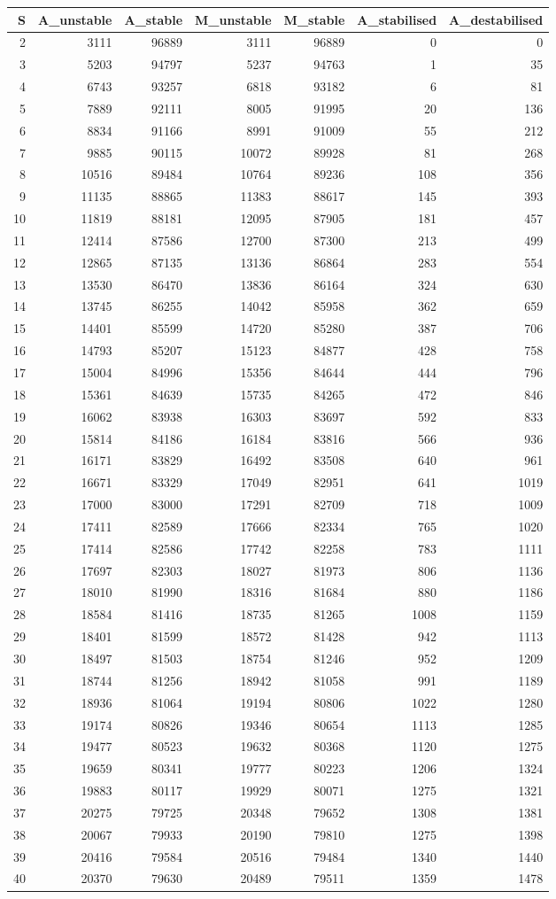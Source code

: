 \documentclass[]{article}
\begin{document}
\begin{longtable}[]{@{}rrrrrrr@{}}
\toprule
S & A\_unstable & A\_stable & M\_unstable & M\_stable & A\_stabilised &
A\_destabilised\tabularnewline
\midrule
\endhead
2 & 3111 & 96889 & 3111 & 96889 & 0 & 0\tabularnewline
3 & 5203 & 94797 & 5237 & 94763 & 1 & 35\tabularnewline
4 & 6743 & 93257 & 6818 & 93182 & 6 & 81\tabularnewline
5 & 7889 & 92111 & 8005 & 91995 & 20 & 136\tabularnewline
6 & 8834 & 91166 & 8991 & 91009 & 55 & 212\tabularnewline
7 & 9885 & 90115 & 10072 & 89928 & 81 & 268\tabularnewline
8 & 10516 & 89484 & 10764 & 89236 & 108 & 356\tabularnewline
9 & 11135 & 88865 & 11383 & 88617 & 145 & 393\tabularnewline
10 & 11819 & 88181 & 12095 & 87905 & 181 & 457\tabularnewline
11 & 12414 & 87586 & 12700 & 87300 & 213 & 499\tabularnewline
12 & 12865 & 87135 & 13136 & 86864 & 283 & 554\tabularnewline
13 & 13530 & 86470 & 13836 & 86164 & 324 & 630\tabularnewline
14 & 13745 & 86255 & 14042 & 85958 & 362 & 659\tabularnewline
15 & 14401 & 85599 & 14720 & 85280 & 387 & 706\tabularnewline
16 & 14793 & 85207 & 15123 & 84877 & 428 & 758\tabularnewline
17 & 15004 & 84996 & 15356 & 84644 & 444 & 796\tabularnewline
18 & 15361 & 84639 & 15735 & 84265 & 472 & 846\tabularnewline
19 & 16062 & 83938 & 16303 & 83697 & 592 & 833\tabularnewline
20 & 15814 & 84186 & 16184 & 83816 & 566 & 936\tabularnewline
21 & 16171 & 83829 & 16492 & 83508 & 640 & 961\tabularnewline
22 & 16671 & 83329 & 17049 & 82951 & 641 & 1019\tabularnewline
23 & 17000 & 83000 & 17291 & 82709 & 718 & 1009\tabularnewline
24 & 17411 & 82589 & 17666 & 82334 & 765 & 1020\tabularnewline
25 & 17414 & 82586 & 17742 & 82258 & 783 & 1111\tabularnewline
26 & 17697 & 82303 & 18027 & 81973 & 806 & 1136\tabularnewline
27 & 18010 & 81990 & 18316 & 81684 & 880 & 1186\tabularnewline
28 & 18584 & 81416 & 18735 & 81265 & 1008 & 1159\tabularnewline
29 & 18401 & 81599 & 18572 & 81428 & 942 & 1113\tabularnewline
30 & 18497 & 81503 & 18754 & 81246 & 952 & 1209\tabularnewline
31 & 18744 & 81256 & 18942 & 81058 & 991 & 1189\tabularnewline
32 & 18936 & 81064 & 19194 & 80806 & 1022 & 1280\tabularnewline
33 & 19174 & 80826 & 19346 & 80654 & 1113 & 1285\tabularnewline
34 & 19477 & 80523 & 19632 & 80368 & 1120 & 1275\tabularnewline
35 & 19659 & 80341 & 19777 & 80223 & 1206 & 1324\tabularnewline
36 & 19883 & 80117 & 19929 & 80071 & 1275 & 1321\tabularnewline
37 & 20275 & 79725 & 20348 & 79652 & 1308 & 1381\tabularnewline
38 & 20067 & 79933 & 20190 & 79810 & 1275 & 1398\tabularnewline
39 & 20416 & 79584 & 20516 & 79484 & 1340 & 1440\tabularnewline
40 & 20370 & 79630 & 20489 & 79511 & 1359 & 1478\tabularnewline

\end{longtable}
\end{document}
